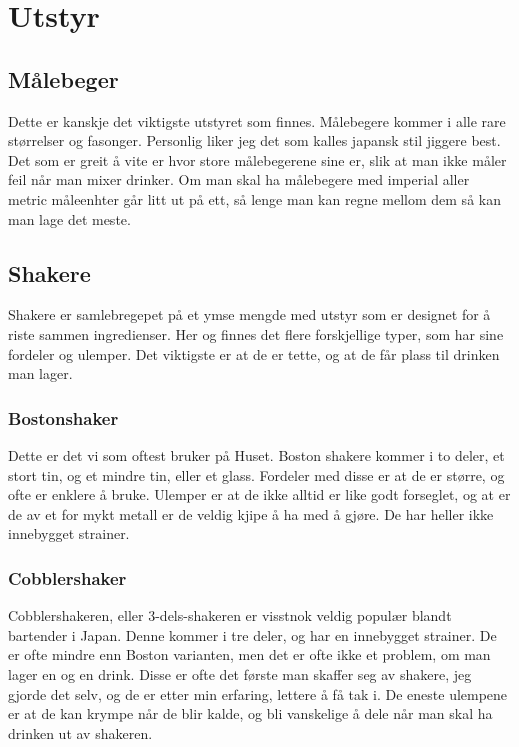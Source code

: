 \section{Utstyr}
\label{sec:utstyr}
\subsection{Målebeger}
Dette er kanskje det viktigste utstyret som finnes. Målebegere kommer i alle rare størrelser og fasonger. Personlig liker jeg det som kalles japansk stil jiggere  best. Det som er greit å vite er hvor store målebegerene sine er, slik at man ikke måler feil når man mixer drinker. Om man skal ha målebegere med imperial aller metric måleenhter går litt ut på ett, så lenge man kan regne mellom dem så kan man lage det meste. 

\subsection{Shakere}
Shakere er samlebregepet på et ymse mengde med utstyr som er designet for å riste sammen ingredienser. Her og finnes det flere forskjellige typer, som har sine fordeler og ulemper. Det viktigste er at de er tette, og at de får plass til drinken man lager.
\subsubsection{Bostonshaker}
Dette er det vi som oftest bruker på Huset. Boston shakere kommer i to deler, et stort tin, og et mindre tin, eller et glass. Fordeler med disse er at de er større, og ofte er enklere å bruke. Ulemper er at de ikke alltid er like godt forseglet, og at er de av et for mykt metall er de veldig kjipe å ha med å gjøre. De har heller ikke innebygget strainer.
\subsubsection{Cobblershaker}
Cobblershakeren, eller 3-dels-shakeren er visstnok veldig populær blandt bartender i Japan. Denne kommer i tre deler, og har en innebygget strainer. De er ofte mindre enn Boston varianten, men det er ofte ikke et problem, om man lager en og en drink. Disse er ofte det første man skaffer seg av shakere, jeg gjorde det selv, og de er etter min erfaring, lettere å få tak i. De eneste ulempene er at de kan krympe når de blir kalde, og bli vanskelige å dele når man skal ha drinken ut av shakeren.

